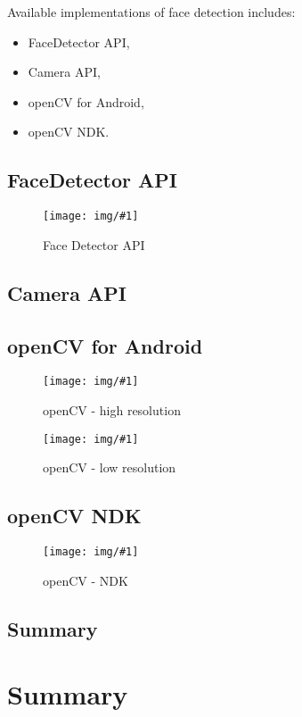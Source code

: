 \documentclass[openany]{mgr} %
\newcommand{\includeimage}[2]{
	\begin{figure}
		\centering
		\texttt{[image: img/\#1]}
		\caption{#2}
		\label{img:#1}
	\end{figure}
}
\begin{document}
Available implementations of face detection includes:
\begin{itemize}
  \item FaceDetector API,
  \item Camera API,
  \item openCV for Android,
  \item openCV NDK.
\end{itemize}


\section{FaceDetector API}



\includeimage{facedetectorapi}{Face Detector API}

\section{Camera API}



\section{openCV for Android}



\includeimage{opencv_high}{openCV - high resolution}
\includeimage{opencv_low}{openCV - low resolution}

\section{openCV NDK}
\includeimage{opencv_ndk}{openCV - NDK}

\section{Summary}

\chapter{Summary}
\end{document}
